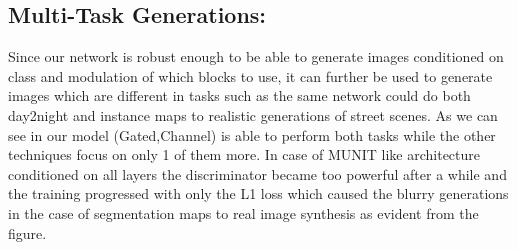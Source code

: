 \subsection{Multi-Task Generations: }
Since our network is robust enough to be able to generate images conditioned on class and modulation of which blocks to use, it can further be used to generate images which are different in tasks such as the same network could do both day2night and instance maps to realistic generations of street scenes. As we can see in  our model (Gated,Channel) is able to perform both tasks while the other techniques focus on only 1 of them more. In case of MUNIT like architecture conditioned on all layers the discriminator became too powerful after a while and the training progressed with only the L1 loss which caused the blurry generations in the case of segmentation maps to real image synthesis as evident from the figure.









